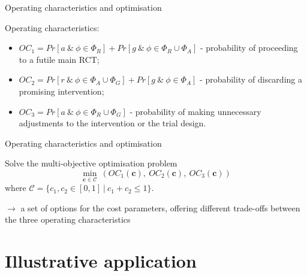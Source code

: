 \documentclass[
  ignorenonframetext,
]{beamer}
\providecommand{\tightlist}{%
  \setlength{\itemsep}{0pt}\setlength{\parskip}{0pt}}
\begin{document}
\begin{frame}{Operating characteristics and optimisation}
\protect\hypertarget{operating-characteristics-and-optimisation}{}

Operating characteristics:

\begin{itemize}
\tightlist
\item
  \(OC_1 = Pr[a ~\&~ \phi \in \Phi_R] + Pr[g ~\&~ \phi \in \Phi_R \cup \Phi_A]\)
  - probability of proceeding to a futile main RCT;
\item
  \(OC_2 = Pr[r ~\&~ \phi \in \Phi_A \cup \Phi_G] + Pr[g ~\&~ \phi \in \Phi_A]\)
  - probability of discarding a promising intervention;
\item
  \(OC_3 = Pr[a ~\&~ \phi \in \Phi_R \cup \Phi_G]\) - probability of
  making unnecessary adjustments to the intervention or the trial
  design.
\end{itemize}

\end{frame}

\begin{frame}{Operating characteristics and optimisation}
\protect\hypertarget{operating-characteristics-and-optimisation-1}{}

Solve the multi-objective optimisation problem \[
\min_{\mathbf{c} \in \mathcal{C}} ~ \left( OC_{1}(\mathbf{c}),~ OC_{2}(\mathbf{c}),~ OC_{3}(\mathbf{c}) \right)
\] where
\(\mathcal{C} = \{c_{1}, c_{2} \in [0,1] ~|~ c_{1} + c_{2} \leq 1\}\).

\(\rightarrow\) a set of options for the cost parameters, offering
different trade-offs between the three operating characteristics

\end{frame}

\hypertarget{illustrative-application}{%
\section{Illustrative application}\label{illustrative-application}}
\end{document}
